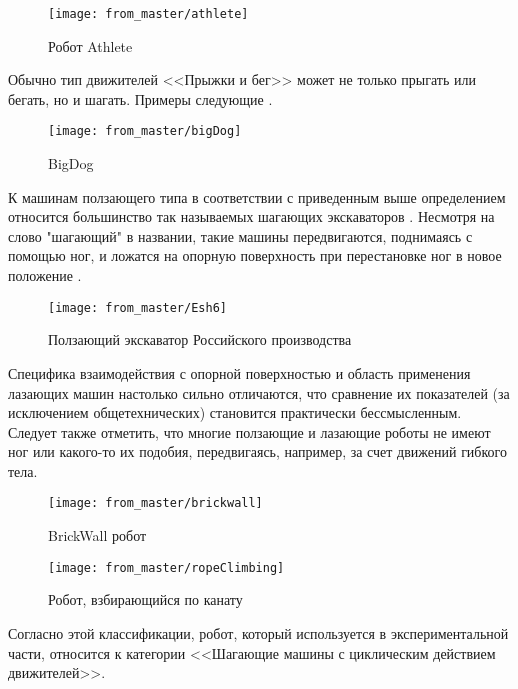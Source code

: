 \begin{figure}[H]
\centering\texttt{[image: from\_master/athlete]}
\caption{Робот Athlete}
\label{fig:athlete}
\end{figure}

Обычно тип движителей <<Прыжки и бег>> может не только прыгать или бегать, но и шагать. Примеры следующие \cite{Pavl2013,volkovaModelirovanieDvizheniyaMnogozvennogo2013,bidgoly2010learning,yacunVibrorobotDlyaVertikalnogo2010} .

\begin{figure}[H]
    \centering\texttt{[image: from\_master/bigDog]}
\caption{BigDog}
\label{fig:bigDog}
\end{figure}

К машинам ползающего типа в соответствии с приведенным выше определением относится большинство так называемых шагающих экскаваторов . Несмотря на слово "шагающий" в названии, такие машины передвигаются, поднимаясь с помощью ног, и ложатся на опорную поверхность при перестановке ног в новое положение \cite{peters2010prototype,gradeckiySostoyaniePerspektivyRazvitiya2014,bidgoly2010learning}.

\begin{figure}[H]
\centering\texttt{[image: from\_master/Esh6]}
\caption{Ползающий экскаватор Российского производства}
\label{fig:Esh6}
\end{figure}

 Специфика взаимодействия с опорной поверхностью и область применения лазающих машин настолько сильно отличаются, что сравнение их показателей (за исключением общетехнических) становится практически бессмысленным. Следует также отметить, что многие ползающие и лазающие роботы не имеют ног или какого-то их подобия, передвигаясь, например, за счет движений гибкого тела.

\begin{figure}[H]
\centering\texttt{[image: from\_master/brickwall]}
\caption{BrickWall робот}
\label{fig:brickwall}
\end{figure}

\begin{figure}[H]
\centering\texttt{[image: from\_master/ropeClimbing]}
\caption{Робот, взбирающийся по канату}
\label{fig:ropeClimbing}
\end{figure}

Согласно этой классификации, робот, который используется в экспериментальной части, относится к категории <<Шагающие машины с циклическим действием движителей>>.

